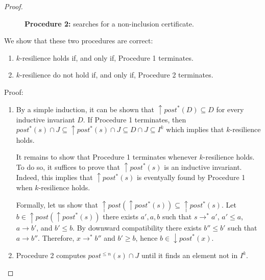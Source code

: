 \begin{proof}
\begin{figure}
	\caption{\textbf{Procedure 2:} searches for a non-inclusion certificate.}\label{procedure2}
\end{figure}

\newpage


We show that these two procedures are correct:


\begin{enumerate}

\item $k$-resilience holds if, and only if, Procedure 1 terminates.

\item $k$-resilience do not hold if, and only if, Procedure 2 terminates.

\end{enumerate}

Proof:

\begin{enumerate}

\item By a simple induction, it can be shown that $\uparrow post^*(D) \subseteq D$ for every inductive invariant $D$. 
If Procedure 1 terminates, then
$post^*(s) \cap J \subseteq \uparrow post^*(s) \cap J \subseteq D  \cap J \subseteq I^k$
which implies that $k$-resilience holds.

It remains to show that Procedure 1 terminates whenever $k$-resilience holds. To do so, it suffices to prove that $\uparrow post^*(s)$ is an inductive invariant. Indeed, this implies that
$\uparrow post^*(s)$ is eventyally found by Procedure 1 when $k$-resilience holds. 

Formally, let us show that $\uparrow post(\uparrow post^*(s)) \subseteq \uparrow post^*(s)$.
Let $b \in \uparrow post(\uparrow post^*(s))$ 
there exists $a', a, b$ such that
$s \rightarrow^* a'$,
$a' \leq a$,
$a \rightarrow b'$,
and
$b' \leq b$.
By downward compatibility 
there exists $b'' \leq b'$ such that $a \rightarrow b'' $. Therefore, $x \rightarrow^* b''$ and $b' \geq b$, hence $b \in \downarrow post^*(x)$.
\item Procedure 2 computes
 $post^{\leq n}(s) \cap J$
 until it finds an element not in $ I^k$.


\end{enumerate}
\end{proof}
